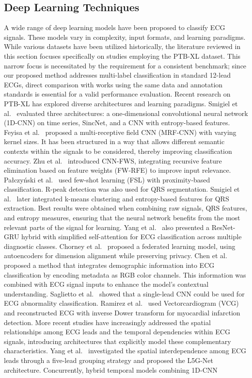 \documentclass[a4paper,fleqn]{cas-dc}
\begin{document}
\subsection{Deep Learning Techniques}
A wide range of deep learning models have been proposed to classify ECG signals. These models vary in complexity, input formats, and learning paradigms. While various datasets have been utilized historically, the literature reviewed in this section focuses specifically on studies employing the PTB-XL dataset. This narrow focus is necessitated by the requirement for a consistent benchmark; since our proposed method addresses multi-label classification in standard 12-lead ECGs, direct comparison with works using the same data and annotation standards is essential for a valid performance evaluation. Recent research on PTB-XL has explored diverse architectures and learning paradigms. Smigiel et al.~\cite{smigiel2021ecg} evaluated three architectures: a one-dimensional convolutional neural network (1D-CNN) on time series, SincNet, and a CNN with entropy-based features. Feyisa et al.~\cite{feyisa2022lightweight} proposed a multi-receptive field CNN (MRF-CNN) with varying kernel sizes. It has been structured in a way that allows different semantic contexts within the signals to be considered, thereby improving classification accuracy. Zhu et al.~\cite{zhu2022cnn} introduced CNN-FWS, integrating recursive feature elimination based on feature weights (FW-RFE) to improve input relevance. Pa{\l}czy{\'n}ski et al.~\cite{krzysztof2022study} used few-shot learning (FSL) with proximity-based classification. R-peak detection was also used for QRS segmentation. Smigiel et al.~\cite{smigiel2021deep} later integrated k-means clustering and entropy-based features for QRS extraction. Best results were obtained when combining raw signals, QRS features, and entropy measures, ensuring that the neural network benefits from the most relevant parts of the signal for learning. Yang et al.~\cite{yang2024fusion} also presented a ResNet-GRU hybrid with simplified self-attention for ECG classification across multiple diagnostic classes. Chorney et al.~\cite{chorney2024towards} proposed a federated learning model, using autoencoders for dimension alignment while preserving privacy. Chen et al.~\cite{chen2024improving} proposed a method that integrates demographic information into ECG classification by encoding metadata as RGB color channels. This information was combined with ECG signal inputs to enhance the model's contextual understanding. Saglietto et al.~\cite{saglietto2024convolutional} showed that a single-lead CNN could be used for ECG abnormality classification. Ramirez et al.~\cite{ramirez2024explainable} used Vectorcardiogram (VCG) and reconstructed ECG with inverse Dower transform for myocardial infarction detection. More recent studies have increasingly addressed the spatial relationships among ECG leads and the temporal dependencies within ECG signals, introducing architectures that explicitly model these complementary characteristics. Yang et al.~\cite{yang2025lead} investigated the spatial interdependence among ECG leads through a five-lead grouping strategy and proposed the L5G-Net architecture. Concurrently, hybrid temporal models combining 1D-CNN 
\end{document}
